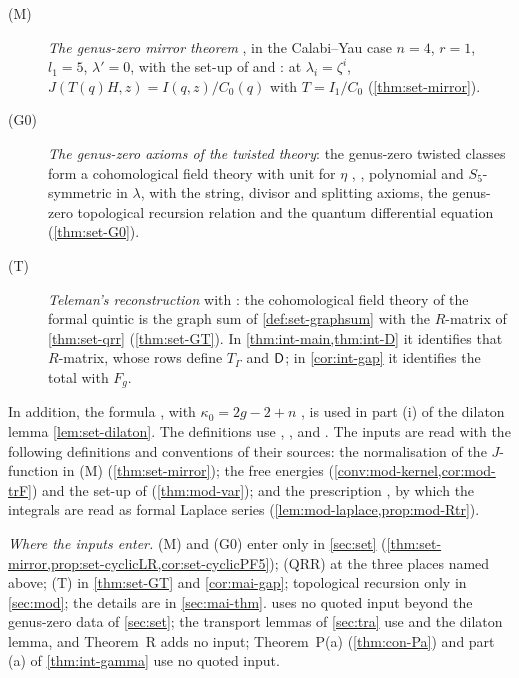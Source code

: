 \begin{description}
\item[(M)] \emph{The genus-zero mirror theorem} \cite[Theorem~11.6]{MR1408320}, in the Calabi--Yau case $n=4$, $r=1$, $l_1=5$, $\lambda'=0$, with the set-up of \cite[\S9]{MR1408320} and \cite[Prop.~11.4]{MR1408320}: at $\lambda_i=\zeta^i$, $J(T(q)H,z)=I(q,z)/C_0(q)$ with $T=I_1/C_0$ (\cref{thm:set-mirror}).
\item[(G0)] \emph{The genus-zero axioms of the twisted theory}: the genus-zero twisted classes form a cohomological field theory with unit for $\eta$ \cite[\S4.1]{GJR18}, \cite[Def.~0.3]{PPZ15}, polynomial and $S_5$-symmetric in $\lambda$, with the string, divisor and splitting axioms, the genus-zero topological recursion relation and the quantum differential equation \cite[\S5.2, (14)]{GJR18} (\cref{thm:set-G0}).
\item[(T)] \emph{Teleman's reconstruction} \cite[Theorem~(2) in (1.15)]{MR2917177} with \cite[\S4.1, Theorem~4.1]{GJR18}: the cohomological field theory of the formal quintic is the graph sum of \cref{def:set-graphsum} with the $R$-matrix of \cref{thm:set-qrr} (\cref{thm:set-GT}). In \cref{thm:int-main,thm:int-D} it identifies that $R$-matrix, whose rows define $T_\Gamma$ and $\mathsf{D}$; in \cref{cor:int-gap} it identifies the total with $F_g$.
\end{description}
In addition, the formula \cite[(1.7)]{AC96}, with $\kappa_0=2g-2+n$ \cite[p.~5]{AC96}, is used in part (i) of the dilaton lemma \cref{lem:set-dilaton}. The definitions use \cite[\S0.2, (5)]{LP18}, \cite[\S0.2, (5), (10)]{LP20}, \cite{ZZ08} and \cite{MR1666787}. The inputs are read with the following definitions and conventions of their sources: the normalisation of the $J$-function \cite[Section~6, (10)]{MR2276766} in (M) (\cref{thm:set-mirror}); the free energies \cite[Def.~4.3, (4-10)]{Eynard:2007kz} (\cref{conv:mod-kernel,cor:mod-trF}) and the set-up \cite[(5-1), (5-4), (5-13)]{Eynard:2007kz} of \cite[Theorem~5.1]{Eynard:2007kz} (\cref{thm:mod-var}); and the prescription \cite[\S3.1, \S3.5]{DuninBarkowski:2012bw}, by which the integrals \cite[(2-31), (2-32)]{Dunin-Barkowski:2015caa} are read as formal Laplace series (\cref{lem:mod-laplace,prop:mod-Rtr}).

\emph{Where the inputs enter.} (M) and (G0) enter only in \cref{sec:set} (\cref{thm:set-mirror,prop:set-cyclicLR,cor:set-cyclicPF5}); (QRR) at the three places named above; (T) in \cref{thm:set-GT} and \cref{cor:mai-gap}; topological recursion only in \cref{sec:mod}; the details are in \cref{sec:mai-thm}.  uses no quoted input beyond the genus-zero data of \cref{sec:set}; the transport lemmas of \cref{sec:tra} use \cite[Defs.~2.2, 2.13]{PPZ15} and the dilaton lemma, and Theorem~R adds no input; Theorem~P(a) (\cref{thm:con-Pa}) and part (a) of \cref{thm:int-gamma} use no quoted input.


